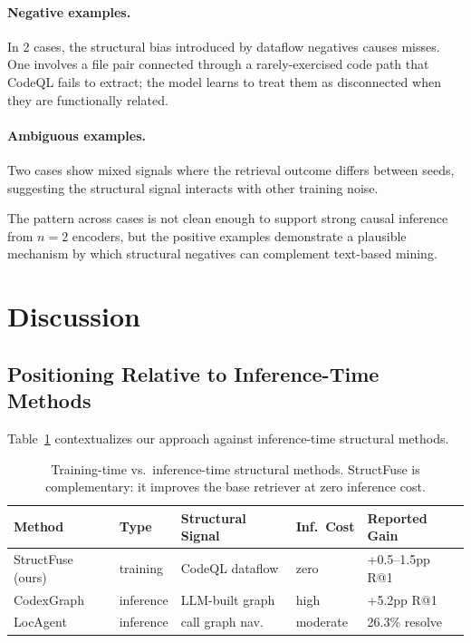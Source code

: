 \documentclass[11pt,a4paper]{article}
\begin{document}
\paragraph{Negative examples.} In 2 cases, the structural bias introduced by dataflow negatives causes misses. One involves a file pair connected through a rarely-exercised code path that CodeQL fails to extract; the model learns to treat them as disconnected when they are functionally related.

\paragraph{Ambiguous examples.} Two cases show mixed signals where the retrieval outcome differs between seeds, suggesting the structural signal interacts with other training noise.

The pattern across cases is not clean enough to support strong causal inference from $n = 2$ encoders, but the positive examples demonstrate a plausible mechanism by which structural negatives can complement text-based mining.

\section{Discussion}
\label{sec:discussion}

\subsection{Positioning Relative to Inference-Time Methods}

Table~\ref{tab:inference_compare} contextualizes our approach against inference-time structural methods.

\begin{table}[t]
\centering
\small
\begin{tabular}{lllll}
\toprule
\textbf{Method} & \textbf{Type} & \textbf{Structural Signal} & \textbf{Inf.\ Cost} & \textbf{Reported Gain} \\
\midrule
StructFuse (ours) & training & CodeQL dataflow & zero & +0.5--1.5pp R@1 \\
CodexGraph & inference & LLM-built graph & high & +5.2pp R@1 \\
LocAgent & inference & call graph nav. & moderate & 26.3\% resolve \\
\bottomrule
\end{tabular}
\caption{Training-time vs.\ inference-time structural methods. StructFuse is complementary: it improves the base retriever at zero inference cost.}
\label{tab:inference_compare}
\end{table}
\end{document}
